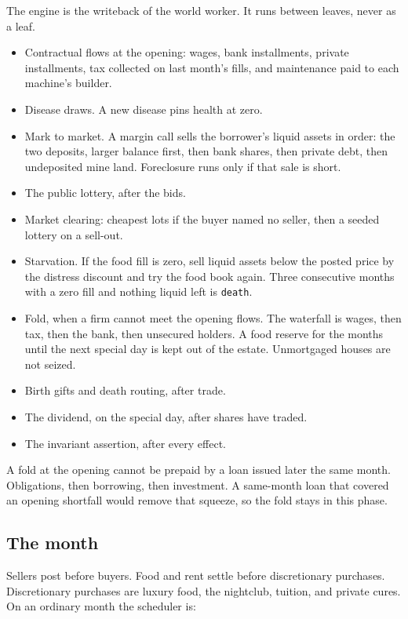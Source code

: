\documentclass[11pt]{article}
\begin{document}
The engine is the writeback of the world worker. It runs between leaves,
never as a leaf.

\begin{itemize}
\item Contractual flows at the opening: wages, bank installments, private
      installments, tax collected on last month's fills, and maintenance
      paid to each machine's builder.
\item Disease draws. A new disease pins health at zero.
\item Mark to market. A margin call sells the borrower's liquid assets in
      order: the two deposits, larger balance first, then bank shares, then
      private debt, then undeposited mine land. Foreclosure runs only if
      that sale is short.
\item The public lottery, after the bids.
\item Market clearing: cheapest lots if the buyer named no seller, then a
      seeded lottery on a sell-out.
\item Starvation. If the food fill is zero, sell liquid assets below the
      posted price by the distress discount and try the food book again.
      Three consecutive months with a zero fill and nothing liquid left is
      \texttt{death}.
\item Fold, when a firm cannot meet the opening flows. The waterfall is
      wages, then tax, then the bank, then unsecured holders. A food reserve
      for the months until the next special day is kept out of the estate.
      Unmortgaged houses are not seized.
\item Birth gifts and death routing, after trade.
\item The dividend, on the special day, after shares have traded.
\item The invariant assertion, after every effect.
\end{itemize}

A fold at the opening cannot be prepaid by a loan issued later the same
month. Obligations, then borrowing, then investment. A same-month loan
that covered an opening shortfall would remove that squeeze, so the fold
stays in this phase.

\subsection{The month}

Sellers post before buyers. Food and rent settle before discretionary
purchases. Discretionary purchases are luxury food, the nightclub, tuition,
and private cures. On an ordinary month the scheduler is:
\end{document}
